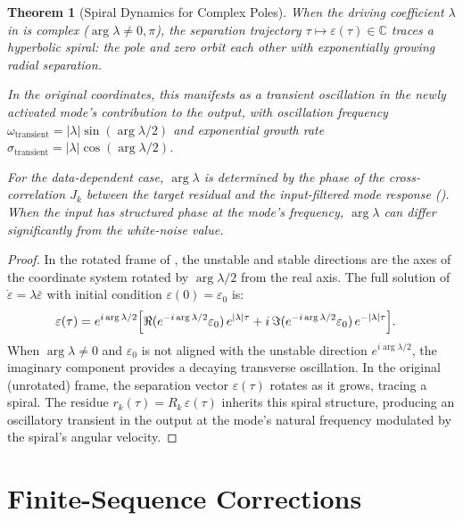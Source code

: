 \documentclass[11pt,a4paper]{article}
\newtheorem{theorem}{Theorem}[section]
\theoremstyle{definition}
\newcommand{\C}{\mathbb{C}}
\newcommand{\eps}{\varepsilon}
\begin{document}
\begin{theorem}[Spiral Dynamics for Complex Poles]%
\label{thm:spiral}
When the driving coefficient $\lambda$ in 
is complex ($\arg\lambda \neq 0, \pi$), the separation trajectory
$\tau \mapsto \eps(\tau) \in \C$ traces a hyperbolic spiral:
the pole and zero orbit each other with exponentially growing
radial separation.

In the original coordinates, this manifests as a transient
oscillation in the newly activated mode's contribution to the
output, with oscillation frequency
$\omega_{\mathrm{transient}} = |\lambda|\sin(\arg\lambda/2)$
and exponential growth rate
$\sigma_{\mathrm{transient}} = |\lambda|\cos(\arg\lambda/2)$.

For the data-dependent case, $\arg\lambda$ is determined by the
phase of the cross-correlation $J_k$ between the target residual
and the input-filtered mode response ().
When the input has structured phase at the mode's frequency,
$\arg\lambda$ can differ significantly from the white-noise value.
\end{theorem}

\begin{proof}
In the rotated frame of , the unstable and
stable directions are the axes of the coordinate system
rotated by $\arg\lambda/2$ from the real axis. The full solution
of $\dot\eps = \lambda\bar\eps$ with initial condition
$\eps(0) = \eps_0$ is:
\begin{align}
  \eps(\tau) &= e^{i\arg\lambda/2}\Bigl[
    \Re(e^{-i\arg\lambda/2}\eps_0)\,e^{|\lambda|\tau}
    + i\,\Im(e^{-i\arg\lambda/2}\eps_0)\,e^{-|\lambda|\tau}
  \Bigr].
\end{align}
When $\arg\lambda \neq 0$ and $\eps_0$ is not aligned with the
unstable direction $e^{i\arg\lambda/2}$, the imaginary component
provides a decaying transverse oscillation. In the original
(unrotated) frame, the separation vector $\eps(\tau)$ rotates as
it grows, tracing a spiral. The residue
$r_k(\tau) = R_k\, \eps(\tau)$ inherits this spiral structure,
producing an oscillatory transient in the output at the mode's
natural frequency modulated by the spiral's angular velocity.
\end{proof}

\section{Finite-Sequence Corrections}\label{sec:finite}
\end{document}

